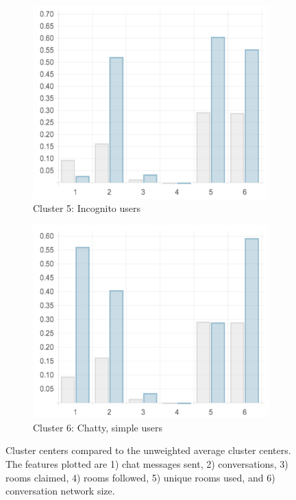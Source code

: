 \begin{figure}
  \begin{subfigure}[t]{0.45\textwidth}
    \includegraphics[width=\textwidth]{Figures/clusterings/confluence-post/cluster5-chart}
    \caption{Cluster 5: Incognito users}
    \label{fig:cluster5-chart}
  \end{subfigure}
  \hfill
  \begin{subfigure}[t]{0.45\textwidth}
    \includegraphics[width=\textwidth]{Figures/clusterings/confluence-post/cluster6-chart}
    \caption{Cluster 6: Chatty, simple users}
    \label{fig:cluster6-chart}
  \end{subfigure}

  \caption{Cluster centers compared to the unweighted average cluster centers. \\ The features plotted are 1) chat messages sent, 2) conversations, 3) rooms claimed, 4) rooms followed, 5) unique rooms used, and 6) conversation network size.}
\end{figure}

